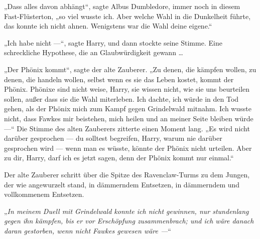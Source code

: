 „Dass alles davon abhängt“, sagte Albus Dumbledore, immer noch in diesem Fast-Flüsterton, „so viel wusste ich. Aber welche Wahl in die Dunkelheit führte, das konnte ich nicht ahnen. Wenigstens war die Wahl deine eigene.“

„Ich habe nicht —“, sagte Harry, und dann stockte seine Stimme.
Eine schreckliche Hypothese, die an Glaubwürdigkeit gewann …

„Der Phönix kommt“, sagte der alte Zauberer.
„Zu denen, die kämpfen wollen, zu denen, die handeln wollen, selbst wenn es sie das Leben kostet, kommt der Phönix. Phönixe sind nicht weise, Harry, sie wissen nicht, wie sie uns beurteilen sollen, außer dass sie die Wahl miterleben. Ich dachte, ich würde in den Tod gehen, als der Phönix mich zum Kampf gegen Grindelwald mitnahm. Ich wusste nicht, dass Fawkes mir beistehen, mich heilen und an meiner Seite bleiben würde —“
Die Stimme des alten Zauberers zitterte einen Moment lang.
„Es wird nicht darüber gesprochen — du solltest begreifen, Harry, warum nie darüber gesprochen wird — wenn man es wüsste, könnte der Phönix nicht urteilen. Aber zu dir, Harry, darf ich es jetzt sagen, denn der Phönix kommt nur einmal.“

Der alte Zauberer schritt über die Spitze des Ravenclaw-Turms zu dem Jungen, der wie angewurzelt stand, in dämmerndem Entsetzen, in dämmerndem und vollkommenem Entsetzen.

„\emph{In meinem Duell mit Grindelwald konnte ich nicht gewinnen, nur stundenlang gegen ihn kämpfen, bis er vor Erschöpfung zusammenbrach; und ich wäre danach daran gestorben, wenn nicht Fawkes gewesen wäre —}“


